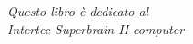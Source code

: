\begin{titlepage}
\vspace*{\fill}

\begin{flushright}
\emph{Questo libro è dedicato al \\
Intertec Superbrain II computer}

\end{flushright}

\vspace*{\fill}
\end{titlepage}
